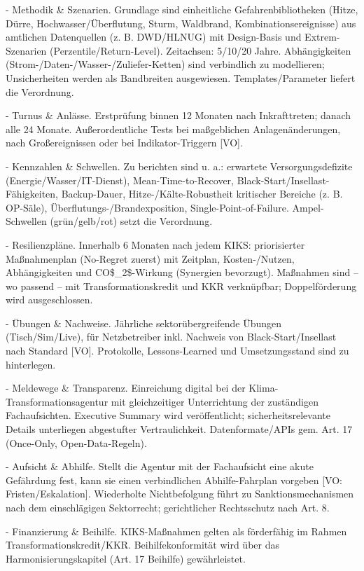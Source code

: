 \documentclass[12pt,a4paper]{scrartcl}
\begin{document}
- Methodik \& Szenarien. Grundlage sind einheitliche Gefahrenbibliotheken (Hitze, Dürre, Hochwasser/Überflutung, Sturm, Waldbrand, Kombinationsereignisse) aus amtlichen Datenquellen (z. B. DWD/HLNUG) mit Design-Basis und Extrem-Szenarien (Perzentile/Return-Level). Zeitachsen: 5/10/20 Jahre. Abhängigkeiten (Strom-/Daten-/Wasser-/Zuliefer-Ketten) sind verbindlich zu modellieren; Unsicherheiten werden als Bandbreiten ausgewiesen. Templates/Parameter liefert die Verordnung.

- Turnus \& Anlässe. Erstprüfung binnen 12 Monaten nach Inkrafttreten; danach alle 24 Monate. Außerordentliche Tests bei maßgeblichen Anlagenänderungen, nach Großereignissen oder bei Indikator-Triggern [VO].

- Kennzahlen \& Schwellen. Zu berichten sind u. a.: erwartete Versorgungsdefizite (Energie/Wasser/IT-Dienst), Mean-Time-to-Recover, Black-Start/Insellast-Fähigkeiten, Backup-Dauer, Hitze-/Kälte-Robustheit kritischer Bereiche (z. B. OP-Säle), Überflutungs-/Brandexposition, Single-Point-of-Failure. Ampel-Schwellen (grün/gelb/rot) setzt die Verordnung.

- Resilienzpläne. Innerhalb 6 Monaten nach jedem KIKS: priorisierter Maßnahmenplan (No-Regret zuerst) mit Zeitplan, Kosten-/Nutzen, Abhängigkeiten und CO\$\_2\$-Wirkung (Synergien bevorzugt). Maßnahmen sind -- wo passend -- mit Transformationskredit und KKR verknüpfbar; Doppelförderung wird ausgeschlossen.

- Übungen \& Nachweise. Jährliche sektorübergreifende Übungen (Tisch/Sim/Live), für Netzbetreiber inkl. Nachweis von Black-Start/Insellast nach Standard [VO]. Protokolle, Lessons-Learned und Umsetzungsstand sind zu hinterlegen.

- Meldewege \& Transparenz. Einreichung digital bei der Klima-Transformationsagentur mit gleichzeitiger Unterrichtung der zuständigen Fachaufsichten. Executive Summary wird veröffentlicht;  sicherheitsrelevante Details unterliegen abgestufter Vertraulichkeit. Datenformate/APIs gem. Art. 17 (Once-Only, Open-Data-Regeln).

- Aufsicht \& Abhilfe. Stellt die Agentur mit der Fachaufsicht eine akute Gefährdung fest, kann sie einen verbindlichen Abhilfe-Fahrplan vorgeben [VO: Fristen/Eskalation]. Wiederholte Nichtbefolgung führt zu Sanktionsmechanismen nach dem einschlägigen Sektorrecht; gerichtlicher Rechtsschutz nach Art. 8.

- Finanzierung \& Beihilfe. KIKS-Maßnahmen gelten als förderfähig im Rahmen Transformationskredit/KKR. Beihilfekonformität wird über das Harmonisierungskapitel (Art. 17 Beihilfe) gewährleistet.
\end{document}
